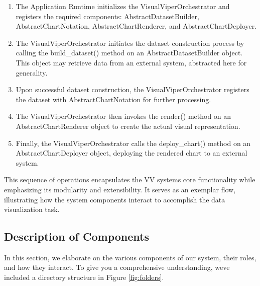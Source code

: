 \begin{enumerate}
\def\labelenumi{\arabic{enumi}.}
\item
  The Application Runtime initializes the VisualViperOrchestrator and
  registers the required components: AbstractDatasetBuilder,
  AbstractChartNotation, AbstractChartRenderer, and
  AbstractChartDeployer.
\item
  The VisualViperOrchestrator initiates the dataset construction process
  by calling the build\_dataset() method on an AbstractDatasetBuilder
  object. This object may retrieve data from an external system,
  abstracted here for generality.
\item
  Upon successful dataset construction, the VisualViperOrchestrator
  registers the dataset with AbstractChartNotation for further
  processing.
\item
  The VisualViperOrchestrator then invokes the render() method on an
  AbstractChartRenderer object to create the actual visual
  representation.
\item
  Finally, the VisualViperOrchestrator calls the deploy\_chart() method
  on an AbstractChartDeployer object, deploying the rendered chart to an
  external system.
\end{enumerate}

This sequence of operations encapsulates the VV system\textquotesingle s
core functionality while emphasizing its modularity and extensibility.
It serves as an exemplar flow, illustrating how the system components
interact to accomplish the data visualization task.

\subsection{Description of Components}\label{description-of-components}

In this section, we elaborate on the various components of our system,
their roles, and how they interact. To give you a comprehensive
understanding, we\textquotesingle ve included a directory structure in
Figure \ref{fig:folders}.



